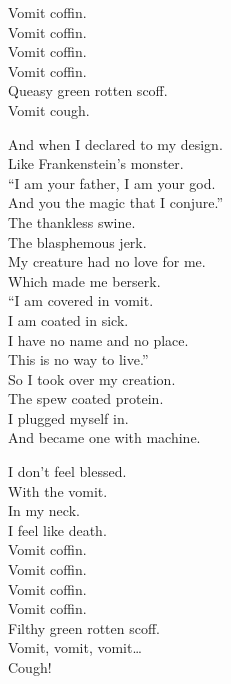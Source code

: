 Vomit coffin. \\
Vomit coffin. \\
Vomit coffin. \\
Vomit coffin. \\

Queasy green rotten scoff. \\

Vomit cough. \\


And when I declared to my design. \\
Like Frankenstein's monster. \\
``I am your father, I am your god. \\
And you the magic that I conjure.'' \\

The thankless swine. \\
The blasphemous jerk. \\
My creature had no love for me. \\
Which made me berserk. \\

``I am covered in vomit. \\
I am coated in sick. \\
I have no name and no place. \\
This is no way to live.'' \\

So I took over my creation. \\
The spew coated protein. \\
I plugged myself in. \\
And became one with machine. \\


I don't feel blessed. \\
With the vomit. \\
In my neck. \\
I feel like death. \\

Vomit coffin. \\
Vomit coffin. \\
Vomit coffin. \\
Vomit coffin. \\

Filthy green rotten scoff. \\

Vomit, vomit, vomit… \\
Cough! \\

